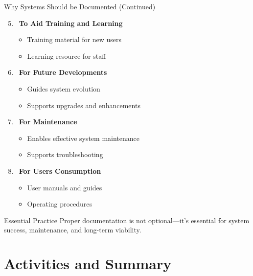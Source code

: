 \documentclass[aspectratio=169]{beamer}
\begin{document}
\begin{frame}{Why Systems Should be Documented (Continued)}
    \begin{enumerate}
        \setcounter{enumi}{4}
        \item\, \textbf{To Aid Training and Learning}
        \begin{itemize}
            \item Training material for new users
            \item Learning resource for staff
        \end{itemize}
        
        \item\, \textbf{For Future Developments}
        \begin{itemize}
            \item Guides system evolution
            \item Supports upgrades and enhancements
        \end{itemize}
        
        \item \faServer\, \textbf{For Maintenance}
        \begin{itemize}
            \item Enables effective system maintenance
            \item Supports troubleshooting
        \end{itemize}
        
        \item \faServer\, \textbf{For Users Consumption}
        \begin{itemize}
            \item User manuals and guides
            \item Operating procedures
        \end{itemize}
    \end{enumerate}
    
    \vspace{0.3cm}
    \begin{alertblock}{Essential Practice}
        Proper documentation is not optional—it's essential for system success, maintenance, and long-term viability.
    \end{alertblock}
\end{frame}

\section{Activities and Summary}
\end{document}
